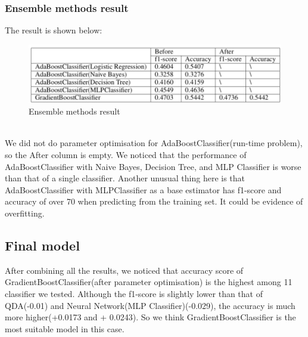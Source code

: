 \documentclass{article}
\begin{document}
\subsubsection{Ensemble methods result}
The result is shown below:\\
\begin{figure}[ht]
\centering
\includegraphics[scale=1]{graphs/ensemble_result_table.png}
\caption{Ensemble methods result}
\label{fig:confusion_matrix}
\end{figure}\\
We did not do parameter optimisation for AdaBoostClassifier(run-time problem), so the After column is empty. We noticed that the performance of AdaBoostClassifier with Naive Bayes, Decision Tree, and MLP Classifier is worse than that of a single classifier. Another unusual thing here is that AdaBoostClassifier with MLPClassifier as a base estimator has f1-score and accuracy of over 70 when predicting from the training set. It could be evidence of overfitting.
\subsection{Final model}
After combining all the results, we noticed that accuracy score of GradientBoostClassifier(after parameter optimisation) is the highest among 11 classifier we tested. Although the f1-score is slightly lower than that of QDA(-0.01) and Neural Network(MLP Classifier)(-0.029), the accuracy is much more higher(+0.0173 and + 0.0243). So we think GradientBoostClassifier is the most suitable model in this case.
\end{document}
